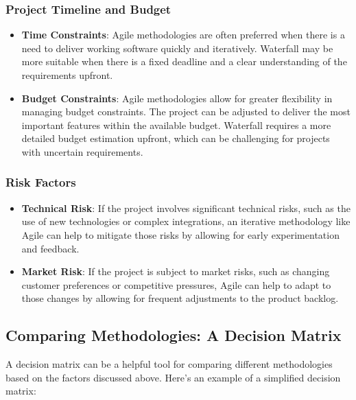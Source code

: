 \subsubsection{Project Timeline and Budget}

\begin{itemize}
  \item \textbf{Time Constraints}: Agile methodologies are often preferred when there is a need to deliver working software quickly and iteratively. Waterfall may be more suitable when there is a fixed deadline and a clear understanding of the requirements upfront.
  \item \textbf{Budget Constraints}: Agile methodologies allow for greater flexibility in managing budget constraints. The project can be adjusted to deliver the most important features within the available budget. Waterfall requires a more detailed budget estimation upfront, which can be challenging for projects with uncertain requirements.
\end{itemize}

\subsubsection{Risk Factors}

\begin{itemize}
  \item \textbf{Technical Risk}: If the project involves significant technical risks, such as the use of new technologies or complex integrations, an iterative methodology like Agile can help to mitigate those risks by allowing for early experimentation and feedback.
  \item \textbf{Market Risk}: If the project is subject to market risks, such as changing customer preferences or competitive pressures, Agile can help to adapt to those changes by allowing for frequent adjustments to the product backlog.
\end{itemize}

\subsection{Comparing Methodologies: A Decision Matrix}

A decision matrix can be a helpful tool for comparing different methodologies
based on the factors discussed above. Here's an example of a simplified
decision matrix:


